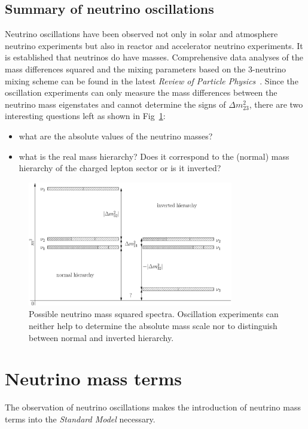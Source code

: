 \subsection{Summary of neutrino oscillations}
\label{sec:allo}
Neutrino oscillations have been observed not only in solar and atmosphere neutrino experiments but also in reactor and accelerator neutrino experiments. It is established that neutrinos do have masses. Comprehensive data analyses of the mass differences squared and the mixing parameters based on the 3-neutrino mixing scheme can be found in the latest \emph{Review of Particle Physics}~\cite{PDG08}. Since the oscillation experiments can only measure the mass differences between the neutrino mass eigenstates and cannot determine the signs of $\Delta m^{2}_{23}$, there are two interesting questions left as shown in Fig~\ref{fig:hie}:
\begin{itemize}
\item what are the absolute values of the neutrino masses?
\item what is the real mass hierarchy? Does it correspond to the   (normal) mass hierarchy of the charged lepton sector or is it   inverted?
\end{itemize}
\begin{figure}[tbhp]
  \centering
  \includegraphics[width=0.8\textwidth]{massHierarchy.eps}  
  \caption{Possible neutrino mass squared spectra. Oscillation     experiments can neither help to determine the absolute mass scale     nor to distinguish between normal and inverted hierarchy.}
  \label{fig:hie}
\end{figure}


\section{Neutrino mass terms}
\label{sec:nema}
The observation of neutrino oscillations makes the introduction of
neutrino mass terms into the \emph{Standard Model} necessary.
